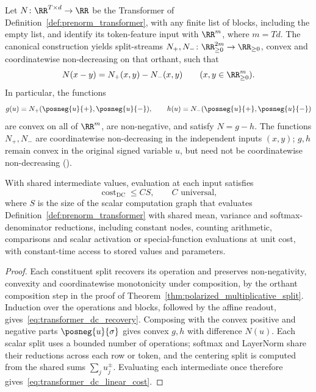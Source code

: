 \begin{theoremenv}\label{thm:transformer_dc}
Let $N\colon\RR^{T\times d}\to\RR$ be the Transformer of Definition~\ref{def:prenorm_transformer}, with any finite list of blocks, including the empty list, and identify its token-feature input with $\RR^m$, where $m=Td$. The canonical construction yields split-streams
$N_+,N_-\colon\RR^{2m}_{\ge0}\to\RR_{\ge0}$,
convex and coordinatewise non-decreasing on that orthant, such that
\begin{equation}
    N(x-y)=N_+(x,y)-N_-(x,y)
    \qquad(x,y\in\RR^m_{\ge0}).
    \label{eq:transformer_dc_recovery}
\end{equation}
In particular, the functions
\begin{equation}
    g(u)=N_+(\posneg{u}{+},\posneg{u}{-}),\qquad
    h(u)=N_-(\posneg{u}{+},\posneg{u}{-})
    \label{eq:transformer_raw_dc}
\end{equation}
are convex on all of $\RR^m$, are non-negative, and satisfy $N=g-h$. The functions $N_+,N_-$ are coordinatewise non-decreasing in the independent inputs $(x,y)$; $g,h$ remain convex in the original signed variable $u$, but need not be coordinatewise non-decreasing ().

With shared intermediate values, evaluation at each input satisfies
\begin{equation}
    \operatorname{cost}_{\mathrm{DC}}\le C S,
    \qquad C\text{ universal},
    \label{eq:transformer_dc_linear_cost}
\end{equation}
where $S$ is the size of the scalar computation graph that evaluates Definition~\ref{def:prenorm_transformer} with shared mean, variance and softmax-denominator reductions, including constant nodes, counting arithmetic, comparisons and scalar activation or special-function evaluations at unit cost, with constant-time access to stored values and parameters.
\end{theoremenv}

\begin{proof}
Each constituent split recovers its operation and preserves non-negativity, convexity and coordinatewise monotonicity under composition, by the orthant composition step in the proof of Theorem~\ref{thm:polarized_multiplicative_split}. Induction over the operations and blocks, followed by the affine readout, gives~\eqref{eq:transformer_dc_recovery}. Composing with the convex positive and negative parts $\posneg{u}{\sigma}$ gives convex $g,h$ with difference $N(u)$.
Each scalar split uses a bounded number of operations; softmax and LayerNorm share their reductions across each row or token, and the centering split is computed from the shared sums $\sum_ju_j^\pm$. Evaluating each intermediate once therefore gives~\eqref{eq:transformer_dc_linear_cost}.
\end{proof}

